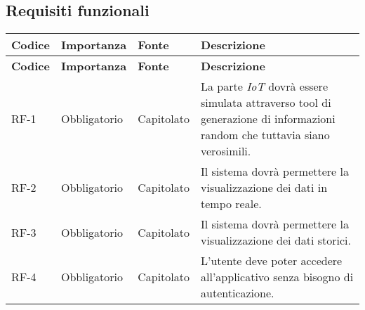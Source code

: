 \subsection{Requisiti funzionali}
\begin{longtable}{|>{\centering\arraybackslash}m{}|>{\centering\arraybackslash}m{}|>{\centering\arraybackslash}m{}|>{\centering\arraybackslash}m{}|}
	\hline
	\textbf{Codice} & \textbf{Importanza} & \textbf{Fonte} & \textbf{Descrizione}                                                                                                                                                                                                                                                                                               \\\hline
	\endfirsthead
	\hline
	\textbf{Codice} & \textbf{Importanza} & \textbf{Fonte} & \textbf{Descrizione}                                                                                                                                                                                                                                                                                               \\\hline
	\endhead
	\hline
	RF-1            & Obbligatorio        & Capitolato     & La parte \textit{IoT} dovrà essere simulata attraverso tool di generazione di informazioni random che tuttavia siano verosimili.                                                                                                                                                                                   \\\hline
	RF-2            & Obbligatorio        & Capitolato     & Il sistema dovrà permettere la visualizzazione dei dati in tempo reale.                                                                                                                                                                                                                                            \\\hline
	RF-3            & Obbligatorio        & Capitolato     & Il sistema dovrà permettere la visualizzazione dei dati storici.                                                                                                                                                                                                                                                   \\\hline
	RF-4            & Obbligatorio        & Capitolato     & L'utente deve poter accedere all'applicativo senza bisogno di autenticazione.                                                                                                                                                                                                                                      \\\hline

\end{longtable}
